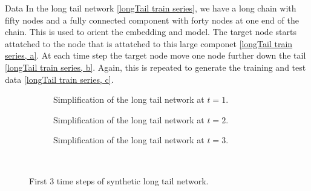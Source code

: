 \documentclass[12pt]{amsart}
\begin{document}
\begin{section}{Data}
    In the long tail network \autoref{longTail train series}, we have a long chain with fifty nodes and a fully connected component with forty nodes at one end of the chain. This is used to orient the embedding and model. The target node starts attatched to the node that is attatched to this large componet \autoref{longTail train series, a}. At each time step the target node move one node further down the tail \autoref{longTail train series, b}. Again, this is repeated to generate the training and test data \autoref{longTail train series, c}.
    \begin{figure}[H]
        \centering
        \begin{subfigure}[c]{0.3\textwidth}
            \centering
            \resizebox{.6\width}{!}{}
            \caption{Simplification of the long tail network at $t=1$.}
            \label{longTail train series, a}
        \end{subfigure}
        \hfill
        \centering
        \begin{subfigure}[c]{0.3\textwidth}
            \centering
            \resizebox{.6\width}{!}{}
            \caption{Simplification of the long tail network at $t=2$.}
            \label{longTail train series, b}
        \end{subfigure}
        \hfill
        \centering
        \begin{subfigure}[c]{0.3\textwidth}
            \centering
            \resizebox{.6\width}{!}{}
            \caption{Simplification of the long tail network at $t=3$.}
            \label{longTail train series, c}
        \end{subfigure}\\
        \caption{First 3 time steps of synthetic long tail network.}
        \label{longTail train series}
    \end{figure}    



\end{section}
\end{document}
